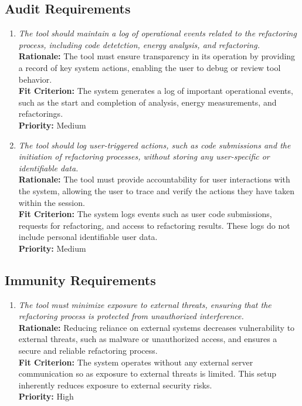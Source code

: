 \documentclass[12pt]{article}
\begin{document}
\subsection{Audit Requirements}
\begin{enumerate}[label=SR-AUR \arabic*., wide=0pt, leftmargin=*]
  \item \emph{The tool should maintain a log of operational events
      related to the refactoring process, including code detetction,
    energy analysis, and refactoring.}\\[2mm]
    {\bf Rationale:} The tool must ensure transparency in its
    operation by providing a record of key system actions, enabling
    the user to debug or review tool behavior.\\
    {\bf Fit Criterion:} The system generates a log of important
    operational events, such as the start and completion of analysis,
    energy measurements, and refactorings. \\[2mm]
    {\bf Priority:} Medium
  \item \emph{The tool should log user-triggered actions, such as
      code submissions and the initiation of refactoring processes,
    without storing any user-specific or identifiable data. }\\
    {\bf Rationale:} The tool must provide accountability for user
    interactions with the system, allowing the user to trace and
    verify the actions they have taken within the session.\\
    {\bf Fit Criterion:}  The system logs events such as user code
    submissions, requests for refactoring, and access to refactoring
    results. These logs do not include personal identifiable user data.\\
    {\bf Priority:} Medium
\end{enumerate}
\subsection{Immunity Requirements}
\begin{enumerate}[label=SR-IMR \arabic*., wide=0pt, leftmargin=*]
  \item \emph{The tool must minimize exposure to external threats,
      ensuring that the refactoring process is protected from
    unauthorized interference.}\\[2mm]
    {\bf Rationale:} Reducing reliance on external systems decreases
    vulnerability to external threats, such as malware or
    unauthorized access, and ensures a secure and reliable
    refactoring process.\\
    {\bf Fit Criterion:} The system operates without any external
    server communication so as exposure to external threats is
    limited. This setup inherently reduces exposure to external
    security risks.\\
    {\bf Priority:} High
\end{enumerate}
\end{document}
